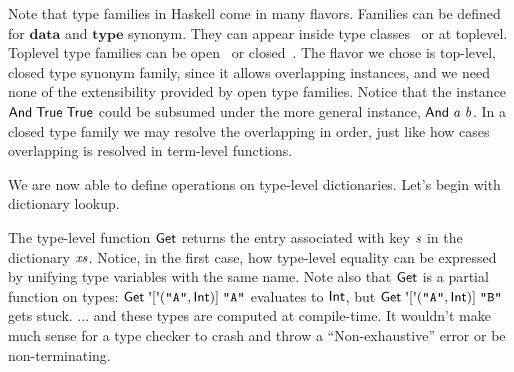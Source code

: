 Note that type families in Haskell come in many flavors. Families can be
defined for \ensuremath{\mathbf{data}} and \ensuremath{\mathbf{type}} synonym. They can appear inside type
classes~\cite{tfclass,tfsynonym} or at toplevel. Toplevel type families
can be open~\cite{tfopen} or closed~\cite{tfclosed}. The flavor we chose
is top-level, closed type synonym family, since it allows overlapping
instances, and we need none of the extensibility provided by open type
families. Notice that the instance \ensuremath{\Conid{And}\;\Conid{True}\;\Conid{True}} could be subsumed under
the more general instance, \ensuremath{\Conid{And}\;\Varid{a}\;\Varid{b}}. In a closed type family we may resolve
the overlapping in order, just like how cases overlapping is resolved in term-level functions.


We are now able to define operations on type-level dictionaries.
Let's begin with dictionary lookup.
\resethooks
The type-level function \ensuremath{\Conid{Get}} returns the entry associated with key \ensuremath{\Varid{s}} in the
dictionary \ensuremath{\Varid{xs}}. Notice, in the first case, how type-level equality can be
expressed by unifying type variables with the same name.
Note also that \ensuremath{\Conid{Get}} is a partial function on types:
\ensuremath{\Conid{Get}\;\mbox{\textquotesingle}[\mbox{\textquotesingle}(\text{\tt \char34 A\char34},\Conid{Int})]\;\text{\tt \char34 A\char34}} evaluates to \ensuremath{\Conid{Int}}, but
\ensuremath{\Conid{Get}\;\mbox{\textquotesingle}[\mbox{\textquotesingle}(\text{\tt \char34 A\char34},\Conid{Int})]\;\text{\tt \char34 B\char34}} gets stuck.
... and these types are computed at compile-time. It wouldn't make
much sense for a type checker to crash and throw a ``Non-exhaustive'' error or
be non-terminating.

